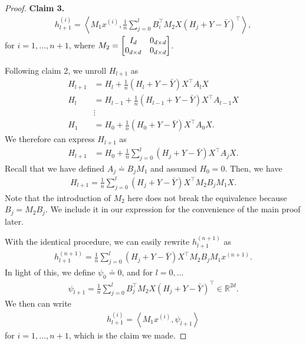 \documentclass{article}
\newcommand{\R}{\mathbb{R}}
\newcommand{\indot}[2]{{\left<#1, #2\right>}}
\begin{document}
\begin{proof}
    \textbf{Claim 3.}
    \begin{align}
      h_{l+1}^{(i)} = \indot{M_1 x^{(i)}}{\frac{1}{n}\sum_{j=0}^l B_i^\top M_2 X (H_j + Y - \bar{Y})^\top},
    \end{align}
    for $i = 1, \dots, n+1$, where $M_2 = \mqty[I_{d} & 0_{d\times d}\\ 0_{d\times d} & 0_{d\times d}]$.

    Following claim 2, we unroll $H_{l+1}$ as
    \begin{align}
        H_{l+1} &= H_l + \frac{1}{n} (H_l + Y - \bar{Y}) X^\top A_l X\\
        H_l &= H_{l-1} + \frac{1}{n} (H_{l-1} + Y - \bar{Y}) X^\top A_{l-1} X\\
        &\vdots\\
        H_1 &= H_0 + \frac{1}{n} (H_0 + Y - \bar{Y}) X^\top A_0 X.
    \end{align}
    We therefore can express $H_{l+1}$ as
    \begin{align}
        H_{l+1} &= H_0 + \frac{1}{n}\sum_{j=0}^l (H_j + Y - \bar{Y})X^\top A_j X.
    \end{align}
    Recall that we have defined $A_j \doteq B_j M_1$ and assumed $H_0 = 0$.
    Then, we have
    \begin{align}
        H_{l+1} = \frac{1}{n} \sum_{j=0}^l (H_j + Y - \bar{Y})X^\top M_2 B_j M_1 X.
    \end{align}
    Note that the introduction of $M_2$ here does not break the equivalence because $B_j = M_2 B_j$.
    We include it in our expression for the convenience of the main proof later.

    With the identical procedure, we can easily rewrite $h_{l+1}^{(n+1)}$ as
    \begin{align}
        h_{l+1}^{(n+1)} 
        = \frac{1}{n} \sum_{j=0}^l (H_j + Y - \bar{Y})X^\top M_2 B_j M_1 x^{(n+1)}.
    \end{align}
    In light of this, we define $\psi_0 \doteq 0$, and for $l = 0, \dots$
    \begin{align}
        \psi_{l+1} = \frac{1}{n} \sum_{j=0}^l B_j^\top M_2 X (H_j + Y - \bar{Y})^\top \in \R^{2d}.
    \end{align}
    We then can write
    \begin{align}
        h_{l+1}^{(i)} = \indot{M_1 x^{(i)}}{\psi_{l+1}} \label{eq: h inner prod}
    \end{align}
    for $i = 1, \dots, n + 1$, which is the claim we made.
    

\end{proof}
\end{document}
